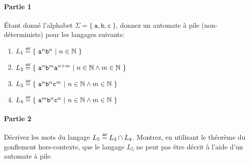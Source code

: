 \documentclass[12pt,french,a4paper]{article}
\newcommand\eqdef{\mathrel{\overset{\makebox[0pt]{\mbox{\normalfont\tiny\sffamily déf}}}{=}}}
\begin{document}
\begin{question}

\paragraph{Partie 1}

Étant donné l'alphabet $\Sigma = \{\ \texttt{a}, \texttt{b}, \texttt{c}\ \}$, donnez un automate à pile (non-déterministe) pour les langages suivants:
\begin{enumerate}
\item $L_1 \eqdef \{\ \texttt{a}^n\texttt{b}^n\ |\ n \in \mathbb{N} \ \}$
\item $L_2 \eqdef \{\ \texttt{a}^n\texttt{b}^m\texttt{a}^{n+m}\ |\ n \in \mathbb{N} \wedge m \in \mathbb{N}\ \}$
\item $L_3 \eqdef \{\ \texttt{a}^n\texttt{b}^n\texttt{c}^{m}\ |\ n \in \mathbb{N} \wedge m \in \mathbb{N}\ \}$
\item $L_4 \eqdef \{\ \texttt{a}^m\texttt{b}^n\texttt{c}^{n}\ |\ n \in \mathbb{N} \wedge m \in \mathbb{N}\ \}$
\end{enumerate}

\paragraph{Partie 2}

Décrivez les mots du langage $L_5 \eqdef L_3 \cap L_4$.
Montrez, en utilisant le théorème du gonflement hors-contexte, que le langage $L_5$ ne peut pas être décrit à l'aide d'un automate à pile.

\end{question}

\newpage
\end{document}
